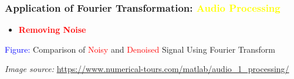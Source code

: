 \documentclass[aspectratio=1610]{beamer}
\begin{document}
  \begin{frame}
    \frametitle{Application of Fourier Transformation: \textcolor{yellow}{Audio Processing}}
    \begin{itemize} [label=$\star$, itemsep=4pt, parsep=0pt, topsep=10pt]
        \item<1-> \textbf{\textcolor{red}{Removing Noise} } 
    \end{itemize}
    \vspace{5pt}
    \hspace{25pt}
     \begin{center}
       \scriptsize \textcolor{blue}{Figure:} Comparison of \textcolor{red}{Noisy} and \textcolor{red}{Denoised} Signal Using Fourier Transform
    \end{center}
    \vfill 
    \tiny \textit{Image source:}
    \url{https://www.numerical-tours.com/matlab/audio_1_processing/}  
  \end{frame}
  
\end{document}
